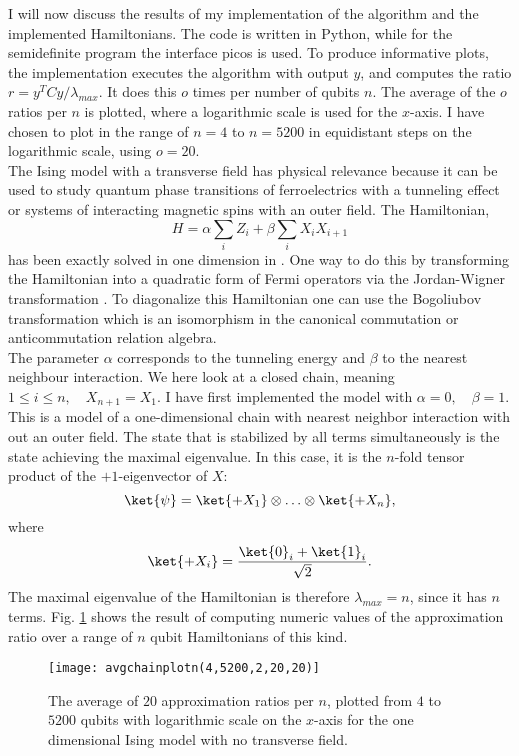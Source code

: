 I will now discuss the results of my implementation of the algorithm and the implemented Hamiltonians.
The code is written in Python, while for the semidefinite program the interface picos is used.
To produce informative plots, the implementation executes the algorithm with output $y$, and computes the ratio $r=y^{T}Cy/\lambda_{max}$.
It does this $o$ times per number of qubits $n$.
The average of the $o$ ratios per $n$ is plotted, where a logarithmic scale is used for the $x$-axis.
I have chosen to plot in the range of $n=4$ to $n=5200$ in equidistant steps on the logarithmic scale, using $o=20$. \\
The Ising model with a transverse field has physical relevance because it can be used to study quantum phase transitions of ferroelectrics with a tunneling effect or systems of interacting magnetic spins with an outer field.
The Hamiltonian,
\[
H=\alpha \sum_{i} Z_i + \beta \sum_{i} X_iX_{i+1}
\]
has been exactly solved in one dimension in \cite{pfeuty70}.
One way to do this by transforming the Hamiltonian into a quadratic form of Fermi operators via the Jordan-Wigner transformation \cite{nielsen05}.
To diagonalize this Hamiltonian one can use the Bogoliubov transformation which is an isomorphism in the canonical commutation or anticommutation relation algebra.\cite{bogoljubov58}\\
The parameter $\alpha$ corresponds to the tunneling energy and $\beta$ to the nearest neighbour interaction.
We here look at a closed chain, meaning $1\le i \le n, \quad X_{n+1}=X_{1}$.
I have first implemented the model with $\alpha =0, \quad \beta =1$.
This is a model of a one-dimensional chain with nearest neighbor interaction with out an outer field.
The state that is stabilized by all terms simultaneously is the state achieving the maximal eigenvalue.
In this case, it is the $n$-fold tensor product of the $+1$-eigenvector of $X$: \[
\ket{\psi}= \ket{+X_1}\otimes\ldots\otimes\ket{+X_n}
,\] where \[
\ket{+X_i}= \frac{\ket{0}_i+\ket{1}_i}{\sqrt{2}}
.\]
The maximal eigenvalue of the Hamiltonian is therefore $\lambda_{max}=n$, since it has $n$ terms.
Fig. \ref{fig:1} shows the result of computing numeric values of the approximation ratio over a range of $n$ qubit Hamiltonians of this kind.
\begin{figure}[H]
	\centering
	\texttt{[image: avgchainplotn(4,5200,2,20,20)]}
	\caption{The average of $20$ approximation ratios per $n$, plotted from $4$ to $5200$ qubits with logarithmic scale on the $x$-axis for the one dimensional Ising model with no transverse field.}
	\label{fig:1}
\end{figure}
